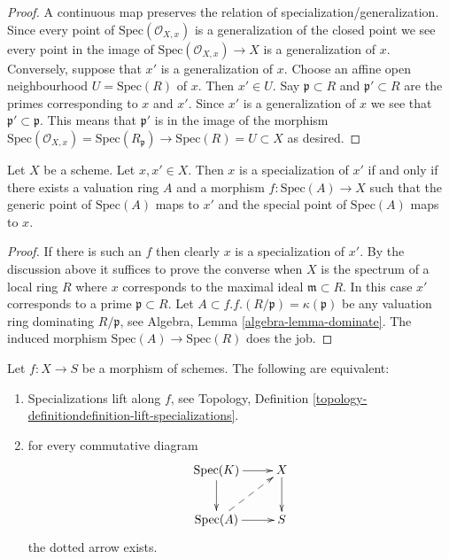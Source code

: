 \begin{proof}
A continuous map preserves the relation of specialization/generalization.
Since every point of $\text{Spec}(\mathcal{O}_{X, x})$ is a
generalization of the closed point we see every point in the image
of $\text{Spec}(\mathcal{O}_{X, x}) \to X$ is a generalization of $x$.
Conversely, suppose that $x'$ is a generalization of $x$.
Choose an affine open neighbourhood $U = \text{Spec}(R)$ of
$x$. Then $x' \in U$. Say $\mathfrak p \subset R$ and
$\mathfrak p' \subset R$ are the primes corresponding
to $x$ and $x'$. Since $x'$ is a generalization of $x$
we see that $\mathfrak p' \subset \mathfrak p$. This means
that $\mathfrak p'$ is in the image of the morphism
$\text{Spec}(\mathcal{O}_{X, x}) = \text{Spec}(R_{\mathfrak p})
\to \text{Spec}(R) = U \subset X$ as desired.
\end{proof}

\begin{lemma}
\label{lemma-points-specialize}
Let $X$ be a scheme. Let $x, x' \in X$.
Then $x$ is a specialization of $x'$ if and only if
there exists a valuation ring $A$ and a morphism
$f : \text{Spec}(A) \to X$ such that the generic
point of $\text{Spec}(A)$ maps to $x'$ and the special
point of $\text{Spec}(A)$ maps to $x$.
\end{lemma}

\begin{proof}
If there is such an $f$ then clearly $x$ is a specialization of $x'$.
By the discussion above it suffices to prove the converse when
$X$ is the spectrum of a local ring $R$ where $x$ corresponds
to the maximal ideal $\mathfrak m \subset R$. In this case
$x'$ corresponds to a prime $\mathfrak p \subset R$.
Let $A \subset f.f.(R/\mathfrak p) = \kappa(\mathfrak p)$
be any valuation ring dominating $R/\mathfrak p$, see
Algebra, Lemma \ref{algebra-lemma-dominate}. The induced morphism
$\text{Spec}(A) \to \text{Spec}(R)$ does the job.
\end{proof}

\begin{lemma}
\label{lemma-specializations-lift}
Let $f : X \to S$ be a morphism of schemes.
The following are equivalent:
\begin{enumerate}
\item Specializations lift along $f$, see
Topology, Definition \ref{topology-definitiondefinition-lift-specializations}.
\item for every commutative diagram
$$
\xymatrix{
\text{Spec}(K) \ar[r] \ar[d] & X \ar[d] \\
\text{Spec}(A) \ar[r] \ar@{-->}[ru] & S
}
$$
the dotted arrow exists.
\end{enumerate}
\end{lemma}

